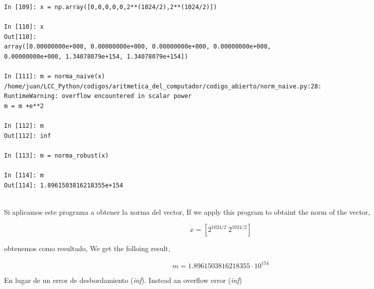 \begin{center}
	\begin{minipage}{\textwidth}
		\begin{verbatim}
In [109]: x = np.array([0,0,0,0,0,2**(1024/2),2**(1024/2)])

In [110]: x
Out[110]: 
array([0.00000000e+000, 0.00000000e+000, 0.00000000e+000, 0.00000000e+000,
0.00000000e+000, 1.34078079e+154, 1.34078079e+154])

In [111]: m = norma_naive(x)
/home/juan/LCC_Python/codigos/aritmetica_del_computador/codigo_abierto/norm_naive.py:28:
RuntimeWarning: overflow encountered in scalar power
m = m +e**2

In [112]: m
Out[112]: inf

In [113]: m = norma_robust(x)

In [114]: m
Out[114]: 1.8961503816218355e+154
	    
\end{verbatim}
\end{minipage}
\end{center}
\begin{paracol}{2}
Si aplicamos este programa a obtener la norma del vector,
\switchcolumn
If we apply this program to obtaint the norm of the vector,
\end{paracol}
\begin{equation*}
x=[2^{1024/2}\ 2^{1024/2}]
\end{equation*}
\begin{paracol}{2}
obtenemos como resultado,
\switchcolumn
We get the folloing result,
\end{paracol}
\begin{equation*}
m=1.8961503816218355\cdot10^{154}
\end{equation*}
\begin{paracol}{2}
En lugar de un error de desbordamiento (\emph{inf}).
\switchcolumn
Instead an overflow error (\emph{inf}) 
\end{paracol}


  	 